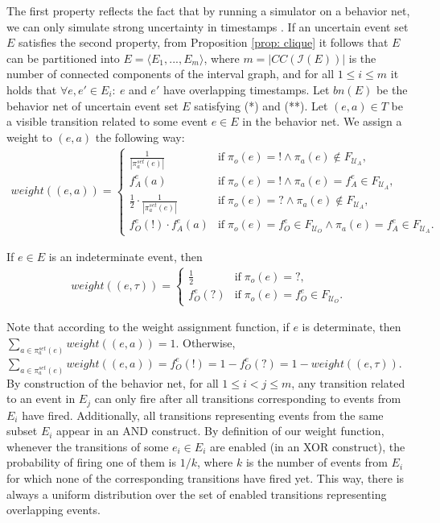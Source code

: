 The first property reflects the fact that by running a simulator on a behavior net, we can only simulate strong uncertainty in timestamps .
If an uncertain event set $E$ satisfies the second property, from Proposition \ref{prop: clique} it follows that $E$ can be partitioned into $E=\langle E_1,...,E_m \rangle$, where $m = |CC(\mathcal{I}(E))|$ is the number of connected components of the interval graph, and for all $1 \leq i \leq m$ it holds that $\forall e,e' \in E_i: ~ e$ and $e'$ have overlapping timestamps.
Let $bn(E)$ be the behavior net of uncertain event set $E$ satisfying (*) and (**).
Let $(e,a) \in T$ be a visible transition related to some event $e \in E$ in the behavior net.
We assign a weight to $(e,a)$ the following way:
\begin{align*}
weight((e,a))  = \begin{cases}
	 \frac{1}{|\pi_a^{set}(e)|} & \mbox{if} \; \pi_o(e)=! \wedge \pi_a(e) \not \in F_{\mathcal{U}_A}, \\
	f_A^{e}(a) & \mbox{if} \; \pi_o(e)=! \wedge \pi_a(e)=f_A^e \in F_{\mathcal{U}_A},  \\
	\frac{1}{2} \cdot \frac{1}{|\pi_a^{set}(e)|} & \mbox{if} \; \pi_o(e) = ? \wedge \pi_a(e) \not \in F_{\mathcal{U}_A}, \\
	f_O^e(!) \cdot f_A^{e}(a) & \mbox{if} \; \pi_o(e)=f_O^e \in F_{\mathcal{U}_O} \wedge \pi_a(e)=f_A^e \in F_{\mathcal{U}_A}.
	\end{cases} 
\end{align*}

If $e \in E$ is an indeterminate event, then 
\begin{align*}
weight((e,\tau))  = \begin{cases}
	 \frac{1}{2} & \mbox{if} \; \pi_o(e)=?, \\
	f_O^{e}(?) & \mbox{if} \; \pi_o(e)=f_O^e \in  F_{\mathcal{U}_O}.
	\end{cases} 
\end{align*}

Note that according to the weight assignment function, if $e$ is determinate, then $\sum_{a \in \pi_a^{set}(e)} \allowbreak weight((e,a)) = 1$.
Otherwise, $\sum_{a \in \pi_a^{set}(e)} weight((e,a)) = f_O^{e}(!) = 1 - f_O^{e}(?) = 1 - weight((e,\tau))$.
By construction of the behavior net, for all $1 \leq i < j \leq m$, any transition related to an event in $E_j$ can only fire after all transitions corresponding to events from $E_i$ have fired.
Additionally, all transitions representing events from the same subset $E_i$ appear in an AND construct.
By definition of our weight function, whenever the transitions of some $e_i \in E_i$ are enabled (in an XOR construct), the probability of firing one of them is $1/k$, where $k$ is the number of events from $E_i$ for which none of the corresponding transitions have fired yet.
This way, there is always a uniform distribution over the set of enabled transitions representing overlapping events.

